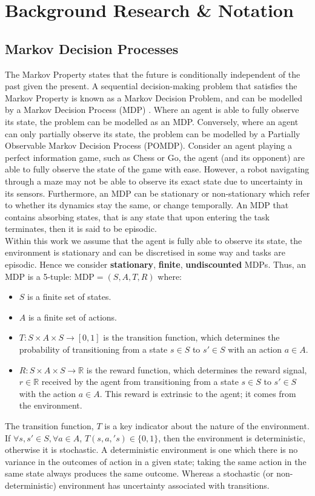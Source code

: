 \chapter{Background Research \& Notation}
\label{chapter2}
\section{Markov Decision Processes}
The Markov Property states that the future is conditionally independent of the past given the present. A sequential decision-making problem that satisfies the Markov Property is known as a Markov Decision Problem, and can be modelled by a Markov Decision Process (MDP) \citep{10.5555/528623}. Where an agent is able to fully observe its state, the problem can be modelled as an MDP. Conversely, where an agent can only partially observe its state, the problem can be modelled by a Partially Observable Markov Decision Process (POMDP).
Consider an agent playing a perfect information game, such as Chess or Go, the agent (and its opponent) are able to fully observe the state of the game with ease. However, a robot navigating through a maze may not be able to observe its exact state due to uncertainty in its sensors.
Furthermore, an MDP can be stationary or non-stationary which refer to whether its dynamics stay the same, or change temporally.
An MDP that contains absorbing states, that is any state that upon entering the task terminates, then it is said to be episodic.
\\Within this work we assume that the agent is fully able to observe its state, the environment is stationary and can be discretised in some way and tasks are episodic.
Hence we consider \textbf{stationary}, \textbf{finite}, \textbf{undiscounted} MDPs.
Thus, an MDP is a 5-tuple: $\text{MDP} = (S,A,T,R)$ where:
\begin{itemize}
    \item $S$ is a finite set of states.
    \item $A$ is a finite set of actions.
    \item $T : S \times A \times S \rightarrow [0,1]$ is the transition function, which determines the probability of transitioning from a state $s \in S$ to $s' \in S$ with an action $a \in A$.
    \item $R:S \times A \times S \rightarrow \mathbb{R}$ is the reward function, which determines the reward signal, $r \in \mathbb{R}$ received by the agent from transitioning from a state $s \in S$ to $s' \in S$ with the action $a \in A$. This reward is extrinsic to the agent; it comes from the environment.
\end{itemize}
The transition function, $T$ is a key indicator about the nature of the environment.
If $\forall s,s' \in S, \forall a \in A$, $T(s,a,'s) \in \{0,1\}$, then the environment is deterministic, otherwise it is stochastic.
A deterministic environment is one which there is no variance in the outcomes of action in a given state; taking the same action in the same state always produces the same outcome. Whereas a stochastic (or non-deterministic) environment has uncertainty associated with transitions.
